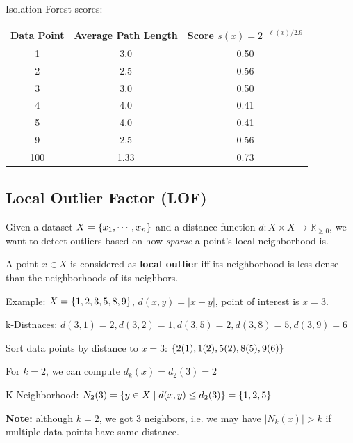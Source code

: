 \documentclass{article}
\begin{document}
Isolation Forest scores:
\begin{table}[h]
\begin{tabular}{c c c}
\toprule
\textbf{Data Point} & \textbf{Average Path Length} & \textbf{Score} $s(x) = 2^{- \ell(x) / 2.9}$ \\
\midrule
1   & 3.0  & 0.50 \\
2   & 2.5  & 0.56 \\
3   & 3.0  & 0.50 \\
4   & 4.0  & 0.41 \\
5   & 4.0  & 0.41 \\
9   & 2.5  & 0.56 \\
100 & 1.33 & 0.73 \\
\bottomrule
\end{tabular}
\end{table}

\subsection*{Local Outlier Factor (LOF)}
Given a dataset $X=\{x_1, \cdots, x_n\}$ and a distance function $d: X \times X \to \mathbb{R}_{\geq 0}$, we want to detect outliers based on how \textit{sparse} a point's local neighborhood is. 

A point $x \in X$ is considered as \textbf{local outlier} iff its neighborhood is less dense than the neighborhoods of its neighbors.



Example: $X=\{1,2,3,5,8,9\}$, $d(x,y)=|x-y|$, point of interest is $x=3$.

k-Distnaces: $d(3, 1) = 2, d(3, 2) = 1, d(3, 5) = 2, d(3,8) = 5, d(3,9) = 6$

Sort data points by distance to $x=3$: $\{2(1), 1(2), 5(2), 8(5), 9(6)\}$

For $k=2$, we can compute $d_k(x) = d_2(3) = 2$

K-Neighborhood: $N_2(3) = \{y \in X \mid d(x, y) \leq d_2(3)\} = \{1, 2, 5\}$

\textbf{Note: }although $k=2$, we got 3 neighbors, i.e. we may have $|N_k(x)| > k$ if multiple data points have same distance.
\end{document}
